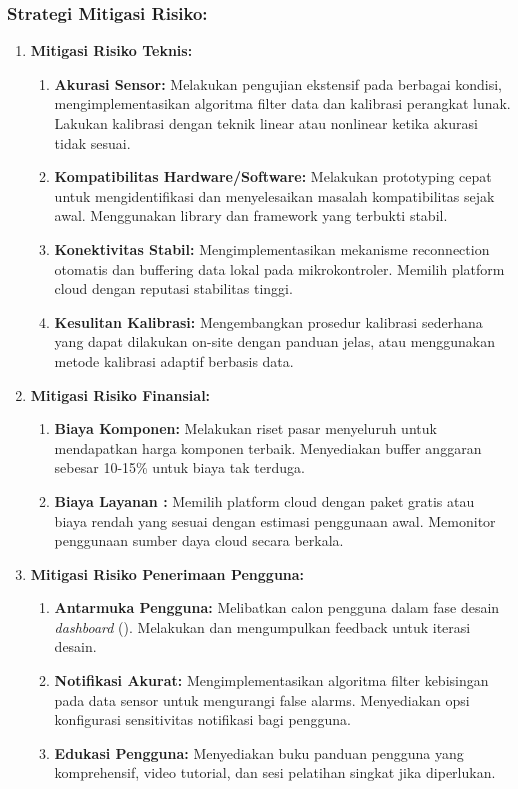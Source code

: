 \documentclass{elsinta}
\begin{document}
\subsubsection*{Strategi Mitigasi Risiko:}
\begin{enumerate}
    \item \textbf{Mitigasi Risiko Teknis:}
    \begin{enumerate}
        \item \textbf{Akurasi Sensor:} Melakukan pengujian ekstensif pada berbagai kondisi, mengimplementasikan algoritma filter data dan kalibrasi perangkat lunak. Lakukan kalibrasi dengan teknik linear atau nonlinear ketika akurasi tidak sesuai.
        \item \textbf{Kompatibilitas Hardware/Software:} Melakukan prototyping cepat untuk mengidentifikasi dan menyelesaikan masalah kompatibilitas sejak awal. Menggunakan library dan framework yang terbukti stabil.
        \item \textbf{Konektivitas  Stabil:} Mengimplementasikan mekanisme reconnection otomatis dan buffering data lokal pada mikrokontroler. Memilih platform cloud dengan reputasi stabilitas tinggi.
        \item \textbf{Kesulitan Kalibrasi:} Mengembangkan prosedur kalibrasi sederhana yang dapat dilakukan on-site dengan panduan jelas, atau menggunakan metode kalibrasi adaptif berbasis data.
    \end{enumerate}
    \item \textbf{Mitigasi Risiko Finansial:}
    \begin{enumerate}
        \item \textbf{Biaya Komponen:} Melakukan riset pasar menyeluruh untuk mendapatkan harga komponen terbaik. Menyediakan buffer anggaran sebesar 10-15\% untuk biaya tak terduga.
        \item \textbf{Biaya Layanan :} Memilih platform cloud dengan paket gratis atau biaya rendah yang sesuai dengan estimasi penggunaan awal. Memonitor penggunaan sumber daya cloud secara berkala.
    \end{enumerate}
    \item \textbf{Mitigasi Risiko Penerimaan Pengguna:}
    \begin{enumerate}
        \item \textbf{Antarmuka Pengguna:} Melibatkan calon pengguna dalam fase desain \emph{dashboard} (). Melakukan  dan mengumpulkan feedback untuk iterasi desain.
        \item \textbf{Notifikasi Akurat:} Mengimplementasikan algoritma filter kebisingan pada data sensor untuk mengurangi false alarms. Menyediakan opsi konfigurasi sensitivitas notifikasi bagi pengguna.
        \item \textbf{Edukasi Pengguna:} Menyediakan buku panduan pengguna yang komprehensif, video tutorial, dan sesi pelatihan singkat jika diperlukan.
    \end{enumerate}
\end{enumerate}
\end{document}
